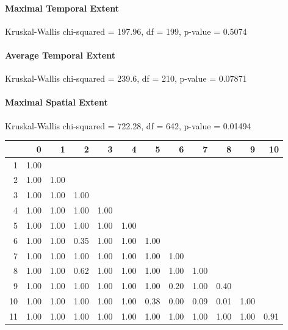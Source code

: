 
\paragraph{Maximal Temporal Extent}
Kruskal-Wallis chi-squared = 197.96, df = 199, p-value = 0.5074

\paragraph{Average Temporal Extent}
Kruskal-Wallis chi-squared = 239.6, df = 210, p-value = 0.07871

\paragraph{Maximal Spatial Extent}
Kruskal-Wallis chi-squared = 722.28, df = 642, p-value = 0.01494
\begin{tabular}{rrrrrrrrrrrr}
	\toprule
	& 0 & 1 & 2 & 3 & 4 & 5 & 6 & 7 & 8 & 9 & 10 \\ 
	\midrule
	1 & 1.00 &  &  &  &  &  &  &  &  &  &  \\ 
	2 & 1.00 & 1.00 &  &  &  &  &  &  &  &  &  \\ 
	3 & 1.00 & 1.00 & 1.00 &  &  &  &  &  &  &  &  \\ 
	4 & 1.00 & 1.00 & 1.00 & 1.00 &  &  &  &  &  &  &  \\ 
	5 & 1.00 & 1.00 & 1.00 & 1.00 & 1.00 &  &  &  &  &  &  \\ 
	6 & 1.00 & 1.00 & 0.35 & 1.00 & 1.00 & 1.00 &  &  &  &  &  \\ 
	7 & 1.00 & 1.00 & 1.00 & 1.00 & 1.00 & 1.00 & 1.00 &  &  &  &  \\ 
	8 & 1.00 & 1.00 & 0.62 & 1.00 & 1.00 & 1.00 & 1.00 & 1.00 &  &  &  \\ 
	9 & 1.00 & 1.00 & 1.00 & 1.00 & 1.00 & 1.00 & 0.20 & 1.00 & 0.40 &  &  \\ 
	10 & 1.00 & 1.00 & 1.00 & 1.00 & 1.00 & 0.38 & 0.00 & 0.09 & 0.01 & 1.00 &  \\ 
	11 & 1.00 & 1.00 & 1.00 & 1.00 & 1.00 & 1.00 & 1.00 & 1.00 & 1.00 & 1.00 & 0.91 \\ 
	\bottomrule
\end{tabular}
